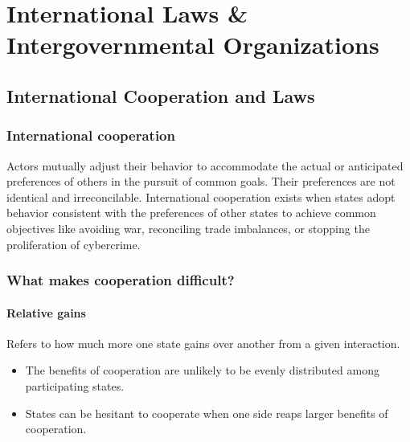 \documentclass[
]{book}
\begin{document}
\hypertarget{international-laws-intergovernmental-organizations}{%
\chapter{International Laws \& Intergovernmental Organizations}\label{international-laws-intergovernmental-organizations}}

\hypertarget{international-cooperation-and-laws}{%
\section{International Cooperation and Laws}\label{international-cooperation-and-laws}}

\hypertarget{international-cooperation}{%
\subsection{International cooperation}\label{international-cooperation}}

Actors mutually adjust their behavior to accommodate the actual or anticipated preferences of others in the pursuit of common goals. Their preferences are not identical and irreconcilable. International cooperation exists when states adopt behavior consistent with the preferences of other states to achieve common objectives like avoiding war, reconciling trade imbalances, or stopping the proliferation of cybercrime.

\hypertarget{what-makes-cooperation-difficult}{%
\subsection{What makes cooperation difficult?}\label{what-makes-cooperation-difficult}}

\hypertarget{relative-gains}{%
\subsubsection{Relative gains}\label{relative-gains}}

Refers to how much more one state gains over another from a given interaction.

\begin{itemize}
\item
  The benefits of cooperation are unlikely to be evenly distributed among participating states.
\item
  States can be hesitant to cooperate when one side reaps larger benefits of cooperation.
\end{itemize}
\end{document}
